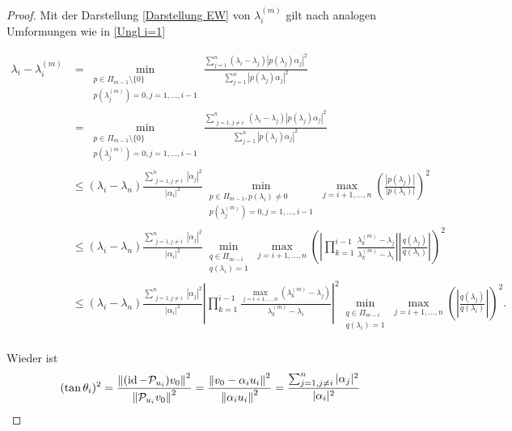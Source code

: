 \documentclass{article}
\begin{document}
\begin{theorem}
\begin{proof}
	Mit der Darstellung \eqref{Darstellung EW} von $\lambda_i^{(m)}$ gilt nach analogen Umformungen wie in \eqref{Ungl i=1}

	\begin{equation*}
		\begin{aligned}
			\lambda_i - \lambda_i^{(m)} &= \min_{\substack{p\in \Pi_{m-1}\setminus \{0\} \\ p(\lambda_j^{(m)}) = 0, j = 1,\dots,i-1}} \frac{\sum_{j=1}^{n} (\lambda_i - \lambda_j)|p(\lambda_j)\alpha_j|^2}{\sum_{j=1}^{n} |p(\lambda_j)\alpha_j|^2} \\
			&= \min_{\substack{p\in \Pi_{m-1}\setminus \{0\} \\ p(\lambda_j^{(m)}) = 0, j = 1,\dots,i-1}} \frac{\sum_{\substack{j=1, j\neq i}}^{n} (\lambda_i - \lambda_j)|p(\lambda_j)\alpha_j|^2}{\sum_{j=1}^{n} |p(\lambda_j)\alpha_j|^2} \\
			& \le (\lambda_i - \lambda_n) \frac{\sum_{\substack{j=1, j\neq i}}^{n} |\alpha_j|^2}{|\alpha_i|^2} \min_{\substack{p\in \Pi_{m-1}, p(\lambda_i) \neq 0 \\ p(\lambda_j^{(m)}) = 0, j = 1,\dots,i-1}} \max_{j=i+1,\dots,n} \left(\frac{|p(\lambda_j)|}{|p(\lambda_i)|}\right)^2 \\
			&\le (\lambda_i - \lambda_n) \frac{\sum_{\substack{j=1, j\neq i}}^{n} |\alpha_j|^2}{|\alpha_i|^2} \min_{\substack{q\in \Pi_{m-i} \\ q(\lambda_i) = 1}} \max_{j=i+1,\dots,n} \left(\left|\prod_{k = 1}^{i-1} \frac{\lambda_k^{(m)} -\lambda_j}{\lambda_k^{(m)} - \lambda_i}\right| \left|\frac{q(\lambda_j)}{q(\lambda_i)}\right|\right)^2 \\
			&\le (\lambda_i - \lambda_n) \frac{\sum_{\substack{j=1, j\neq i}}^{n} |\alpha_j|^2}{|\alpha_i|^2} \left|\prod_{k = 1}^{i-1} \frac{\max_{j=i+1,\dots,n} (\lambda_k^{(m)} -\lambda_j)}{\lambda_k^{(m)} - \lambda_i}\right|^2 \min_{\substack{q\in \Pi_{m-i} \\ q(\lambda_i) = 1}} \max_{j=i+1,\dots,n} \left(\left|\frac{q(\lambda_j)}{q(\lambda_i)}\right|\right)^2. \\
		\end{aligned}
	\end{equation*}

	Wieder ist
	\begin{equation*}
		(\tan\theta_i)^2 = \frac{{\left \| (\operatorname{id} - \mathcal{P}_{u_i})v_0 \right \|}_{}^2}{{\left \|  \mathcal{P}_{u_i}v_0 \right \|}_{}^2} = \frac{{\left \| v_0 - \alpha_i u_i \right \|}_{}^2}{{\left \| \alpha_i u_i \right \|}_{}^2} = \frac{\sum_{\substack{j=1, j\neq i}}^{n} |\alpha_j|^2}{|\alpha_i|^2}
	\end{equation*}


\end{proof}
\end{theorem}
\end{document}
